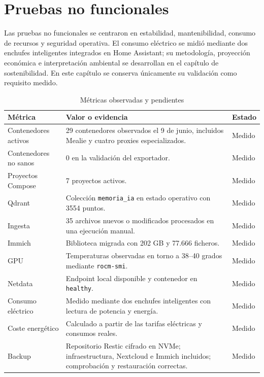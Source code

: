 

\section{Pruebas no funcionales}
Las pruebas no funcionales se centraron en estabilidad, mantenibilidad, consumo de recursos y seguridad operativa. El consumo eléctrico se midió mediante dos enchufes inteligentes integrados en Home Assistant; su metodología, proyección económica e interpretación ambiental se desarrollan en el capítulo de sostenibilidad. En este capítulo se conserva únicamente su validación como requisito medido.

\begin{table}[H]
  \centering
  \caption{Métricas observadas y pendientes}
  \label{tab:metricas-observadas}
  \begin{tabularx}{\textwidth}{lXl}
    \toprule
    Métrica & Valor o evidencia & Estado \\
    \midrule
    Contenedores activos & 29 contenedores observados el 9 de junio, incluidos Mealie y cuatro proxies especializados. & Medido \\
    Contenedores no sanos & 0 en la validación del exportador. & Medido \\
    Proyectos Compose & 7 proyectos activos. & Medido \\
    Qdrant & Colección \texttt{memoria\_ia} en estado operativo con 3554 puntos. & Medido \\
    Ingesta & 35 archivos nuevos o modificados procesados en una ejecución manual. & Medido \\
    Immich & Biblioteca migrada con 202 GB y 77.666 ficheros. & Medido \\
    GPU & Temperaturas observadas en torno a 38--40 grados mediante \texttt{rocm-smi}. & Medido \\
    Netdata & Endpoint local disponible y contenedor en \texttt{healthy}. & Medido \\
    Consumo eléctrico & Medido mediante dos enchufes inteligentes con lectura de potencia y energía. & Medido \\
    Coste energético & Calculado a partir de las tarifas eléctricas y consumos reales. & Medido \\
    Backup & Repositorio Restic cifrado en NVMe; infraestructura, Nextcloud e Immich incluidos; comprobación y restauración correctas. & Medido \\
    \bottomrule
  \end{tabularx}
\end{table}

